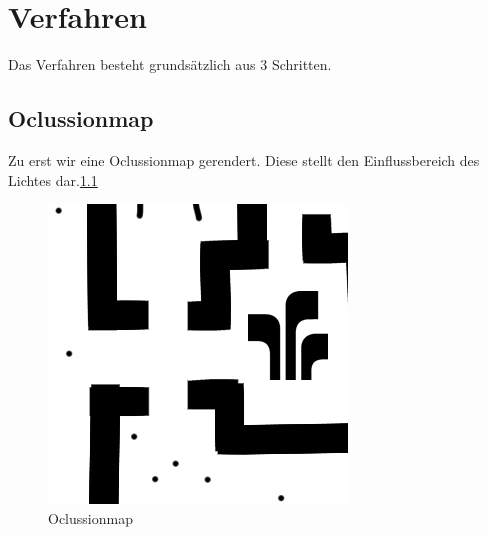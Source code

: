 \chapter{Verfahren}
Das Verfahren besteht grundsätzlich aus 3 Schritten.
\section{Oclussionmap}
Zu erst wir eine Oclussionmap gerendert.
Diese stellt den Einflussbereich des Lichtes dar.\ref{o_1}
\begin{figure}
	\centering
	\includegraphics{images/oclusion.png}
	\caption{Oclussionmap}
	\label{o_1}
\end{figure}

